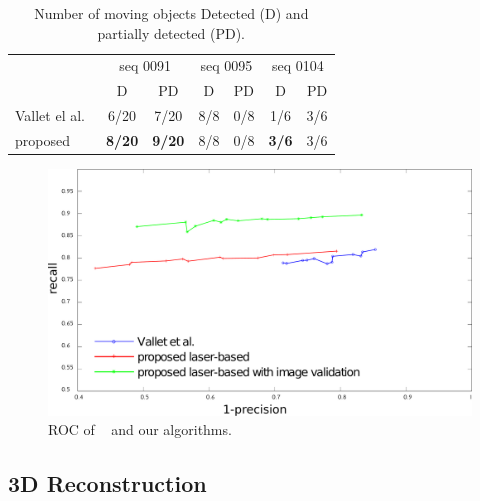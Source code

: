 \begin{table}[t]
\caption{Number of  moving objects Detected (D) and partially detected (PD).}
\label{tab:numPRobj}
\centering
\begin{tabular}{lcccccc}
\toprule 
&\multicolumn{2}{c}{seq 0091}&\multicolumn{2}{c}{seq 0095}&\multicolumn{2}{c}{seq 0104}\\
&D & PD &D & PD &D & PD \\
\midrule
Vallet el al.~\cite{vallet2015extracting}       & 6/20  & 7/20  & 8/8 &   0/8   &    1/6        & 3/6\\
proposed & \textbf{8/20}        & \textbf{9/20} & 8/8 &   0/8   &    \textbf{3/6}       & 3/6 \\
\end{tabular}
\end{table}

\begin{figure}[t]
\centering
\includegraphics[width=0.8\columnwidth]{./img/ch-laser/graphres3}
\caption{ROC of ~\cite{vallet2015extracting} and our algorithms.}
\label{fig:roc}
\end{figure}

\subsection{3D Reconstruction}




